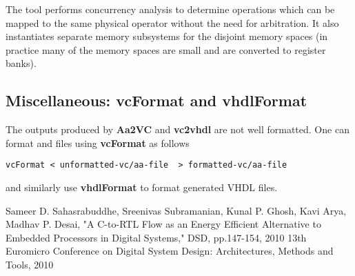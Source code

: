 The tool performs concurrency analysis to determine operations which
can be mapped to the same physical operator without the need for
arbitration.  It also instantiates separate memory subsystems for
the disjoint memory spaces (in practice many of the memory spaces
are small and are converted to register banks).

\subsection{Miscellaneous: {\bf vcFormat} and {\bf vhdlFormat}}

The outputs produced by {\bf Aa2VC} and {\bf vc2vhdl} are
not well formatted.  One can format \Aa and \vC files
using  {\bf vcFormat} as follows
\begin{verbatim}
vcFormat < unformatted-vc/aa-file  > formatted-vc/aa-file
\end{verbatim}
and similarly use {\bf vhdlFormat} to format generated
VHDL files.


\begin{thebibliography}{99}
Sameer D. Sahasrabuddhe, Sreenivas Subramanian, Kunal P. Ghosh, Kavi Arya, Madhav P. Desai, 
"A C-to-RTL Flow as an Energy Efficient Alternative to Embedded Processors in Digital Systems," 
DSD, pp.147-154, 2010 13th Euromicro Conference on Digital 
System Design: Architectures, Methods and Tools, 2010
\end{thebibliography}

